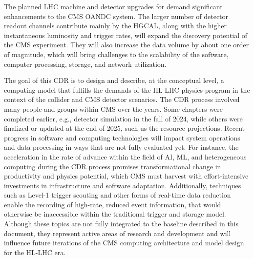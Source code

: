 The planned LHC machine and detector upgrades for \PhaseTwo demand significant enhancements to the CMS \gls{OANDC} system. The larger number of detector readout channels contribute mainly by the \gls{HGCAL}, along with the higher instantaneous luminosity and trigger rates, will expand the discovery potential of the CMS experiment. They will also increase the data volume by about one order of magnitude, which will bring challenges to the scalability of the software, computer processing, storage, and network utilization. 

The goal of this \gls{CDR} is to design and describe, at the conceptual level, a computing model that fulfills the demands of the HL-LHC physics program in the context of the collider and CMS detector scenarios. The \gls{CDR} process involved many people and groups within CMS over the years. Some chapters were completed earlier, e.g., detector simulation in the fall of 2024, while others were finalized or updated at the end of 2025, such us the resource projections.
Recent progress in software and computing technologies will impact system operations and data processing in ways that are not fully evaluated yet. For instance, the acceleration in the rate of advance within the field of \gls{AI}, \gls{ML}, and heterogeneous computing during the CDR process promises transformational change in productivity and physics potential, which CMS must harvest with effort-intensive investments in infrastructure and software adaptation. 
Additionally, techniques such as Level-1 trigger scouting and other forms of real-time data reduction enable the recording of high-rate, reduced event information, that would otherwise be inaccessible within the traditional trigger and storage model. Although these topics are not fully
integrated to the baseline described in this document, they represent active areas of research and development and will influence future iterations of the CMS computing architecture and model design for the \gls{HL-LHC} era.


